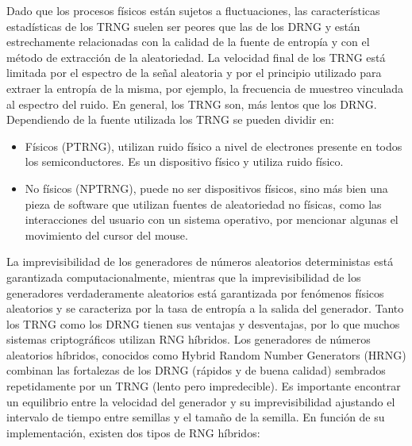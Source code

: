 \begin{enumerate}
                    Dado que los procesos físicos están sujetos a fluctuaciones, las características estadísticas de los TRNG suelen ser peores que las de los DRNG y están estrechamente relacionadas con la calidad de la fuente de entropía y con el método de extracción de la aleatoriedad. La velocidad final de los TRNG está limitada por el espectro de la señal aleatoria y por el principio utilizado para extraer la entropía de la misma, por ejemplo, la frecuencia de muestreo vinculada al espectro del ruido. En general, los TRNG son, más lentos que los DRNG. Dependiendo de la fuente utilizada los TRNG se pueden dividir en:
                
                \begin{itemize}
                    \item Físicos (PTRNG), utilizan ruido físico a nivel de electrones presente en todos los semiconductores. Es un dispositivo físico y utiliza ruido físico.
                    \item No físicos (NPTRNG), puede no ser dispositivos físicos, sino más bien una pieza de software que utilizan fuentes de aleatoriedad no físicas, como las interacciones del usuario con un sistema operativo, por mencionar algunas el movimiento del cursor del mouse.
                \end{itemize}
            \end{enumerate}
	
            La imprevisibilidad de los generadores de números aleatorios deterministas está garantizada computacionalmente, mientras que la imprevisibilidad de los generadores verdaderamente aleatorios está garantizada por fenómenos físicos aleatorios y se caracteriza por la tasa de entropía a la salida del generador. Tanto los TRNG como los DRNG tienen sus ventajas y desventajas, por lo que muchos sistemas criptográficos utilizan RNG híbridos. Los generadores de números aleatorios híbridos, conocidos como Hybrid Random Number Generators (HRNG) combinan las fortalezas de los DRNG (rápidos y de buena calidad) sembrados repetidamente por un TRNG (lento pero impredecible). Es importante encontrar un equilibrio entre la velocidad del generador y su imprevisibilidad ajustando el intervalo de tiempo entre semillas y el tamaño de la semilla. En función de su implementación, existen dos tipos de RNG híbridos:
	
